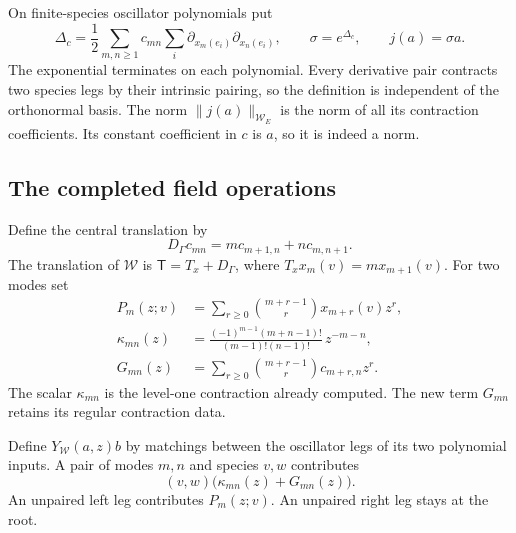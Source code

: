 On finite-species oscillator polynomials put
\begin{equation}\label{v4-eq:singular-contraction-embedding}
 \Delta_c=\frac12\sum_{m,n\geq1}c_{mn}
                   \sum_i\partial_{x_m(e_i)}\partial_{x_n(e_i)},
 \qquad \sigma=e^{\Delta_c},\qquad j(a)=\sigma a.
\end{equation}
The exponential terminates on each polynomial.
Every derivative pair contracts two species
legs by their intrinsic pairing, so the
definition is independent of the orthonormal
basis. The norm \(\|j(a)\|_{\mathcal W_E}\)
is the norm of all its contraction coefficients.
Its constant coefficient in \(c\) is \(a\),
so it is indeed a norm.

\subsection{The completed field operations}

Define the central translation by
\begin{equation}\label{v4-eq:singular-central-translation}
 D_\Gamma c_{mn}=m c_{m+1,n}+n c_{m,n+1}.
\end{equation}
The translation of \(\mathcal W\) is
\(\mathsf T=T_x+D_\Gamma\), where
\(T_xx_m(v)=m x_{m+1}(v)\). For two modes set
\begin{align}
 P_m(z;v)&=\sum_{r\geq0}\binom{m+r-1}{r}
                       x_{m+r}(v)z^r,
                    \label{v4-eq:singular-contraction-Taylor}\\
 \kappa_{mn}(z)&=
   \frac{(-1)^{m-1}(m+n-1)!}{(m-1)!(n-1)!}\,z^{-m-n},
                    \label{v4-eq:singular-contraction-pole}\\
 G_{mn}(z)&=\sum_{r\geq0}\binom{m+r-1}{r}
                            c_{m+r,n}z^r.
                    \label{v4-eq:singular-contraction-regular}
\end{align}
The scalar \(\kappa_{mn}\) is the level-one
contraction already computed. The new term
\(G_{mn}\) retains its regular contraction data.

Define \(Y_{\mathcal W}(a,z)b\) by matchings
between the oscillator legs of its two
polynomial inputs. A pair of modes \(m,n\)
and species \(v,w\) contributes
\begin{equation}\label{v4-eq:singular-contraction-pair}
                    (v,w)\bigl(\kappa_{mn}(z)+G_{mn}(z)\bigr).
\end{equation}
An unpaired left leg contributes \(P_m(z;v)\).
An unpaired right leg stays at the root.

